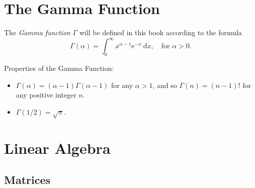 \documentclass[captions=tableheading]{scrbook}
\begin{document}
\begin{example}
\section{The Gamma Function}
\label{sec-21-4}
\label{sec-The-Gamma-Function}


The \emph{Gamma function} \(\Gamma\) will be defined in this book according to the formula
\begin{equation}
\Gamma(\alpha)=\int_{0}^{\infty}x^{\alpha-1}\mathrm{e}^{-x}\:\mathrm{d} x,\quad\mbox{for }\alpha > 0.
\end{equation}

\begin{fact}
Properties of the Gamma Function:
\begin{itemize}
\item \(\Gamma(\alpha)=(\alpha - 1)\Gamma(\alpha - 1)\) for any \(\alpha > 1\), and so \(\Gamma(n)=(n-1)!\) for any positive integer \(n\).
\item \(\Gamma(1/2)=\sqrt{\pi}\).
\end{itemize}

\end{fact}
\section{Linear Algebra}
\label{sec-21-5}
\label{sec-Linear-Algebra}
\subsection{Matrices}
\label{sec-21-5-1}


\end{example}
\end{document}
